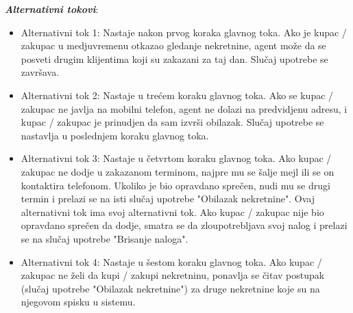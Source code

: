 \documentclass[20pt]{article}
\begin{document}
\textbf{\textit{Alternativni tokovi}}: 
\begin{itemize}
    \item Alternativni tok 1: Nastaje nakon prvog koraka glavnog toka.  Ako je kupac / zakupac u medjuvremenu otkazao gledanje nekretnine, agent mo\v ze da se posveti drugim klijentima koji su zakazani za taj dan. Slu\v caj upotrebe se zavr\v sava.
    \item Alternativni tok 2: Nastaje u tre\' cem koraku glavnog toka. Ako se kupac / zakupac ne javlja na mobilni telefon, agent ne dolazi na predvidjenu adresu, i kupac / zakupac je prinudjen da sam izvr\v si obilazak. Slu\v caj upotrebe se nastavlja u poslednjem koraku glavnog toka.
    \item Alternativni tok 3:  Nastaje u \v cetvrtom koraku glavnog toka. Ako kupac / zakupac ne dodje u zakazanom terminom, najpre mu se \v salje mejl ili se on kontaktira telefonom. Ukoliko je bio opravdano spre\v cen, nudi mu se drugi termin i prelazi se na isti slu\v caj upotrebe "Obilazak nekretnine". Ovaj alternativni tok ima svoj alternativni tok. Ako kupac / zakupac nije bio opravdano spre\v cen da dodje, smatra se da zloupotrebljava svoj nalog i prelazi se na slu\v caj upotrebe "Brisanje naloga". 
    \item Alternativni tok 4: Nastaje u \v sestom koraku glavnog toka. Ako kupac / zakupac ne \v zeli da kupi / zakupi nekretninu, ponavlja se \v citav postupak (slu\v caj upotrebe "Obilazak nekretnine") za druge nekretnine koje su na njegovom spisku u sistemu.  
\hline
\end{itemize}
\end{document}
